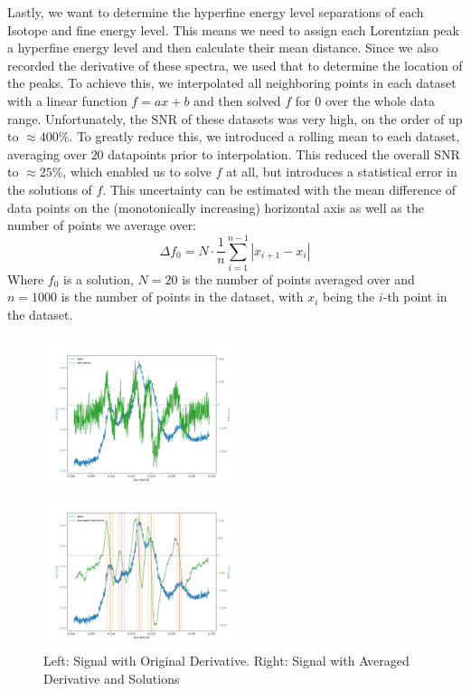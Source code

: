 \documentclass[12pt, a4paper]{article}
\begin{document}
Lastly, we want to determine the hyperfine energy level separations of each Isotope and fine energy level. This means we need to assign each Lorentzian peak a hyperfine energy level and then calculate their mean distance. Since we also recorded the derivative of these spectra, we used that to determine the location of the peaks. To achieve this, we interpolated all neighboring points in each dataset with a linear function $f = ax + b$ and then solved $f$ for $0$ over the whole data range. Unfortunately, the SNR of these datasets was very high, on the order of up to $\approx 400\%$. To greatly reduce this, we introduced a rolling mean to each dataset, averaging over $20$ datapoints prior to interpolation. This reduced the overall SNR to $\approx 25\%$, which enabled us to solve $f$ at all, but introduces a statistical error in the solutions of $f$. This uncertainty can be estimated with the mean difference of data points on the (monotonically increasing) horizontal axis as well as the number of points we average over:
\begin{equation}
\Delta f_0 = N \cdot \frac{1}{n} \sum_{i = 1}^{n - 1} \left\lvert x_{i + 1} - x_i \right\rvert
\label{interpolationuncertainty}
\end{equation}
Where $f_0$ is a solution, $N = 20$ is the number of points averaged over and $n = 1000$ is the number of points in the dataset, with $x_i$ being the $i$-th point in the dataset.

\begin{figure}
    \centering
    \parbox{0.45\textwidth}{
        \includegraphics[width=0.5\textwidth]{originalderivative.png}
    }
    \hfill
    \parbox{0.45\textwidth}{
        \includegraphics[width=0.5\textwidth]{averagedderivative.png}
    }
    \caption{Left: Signal with Original Derivative. Right: Signal with Averaged Derivative and Solutions}
    \label{lorentzianprofile}
\end{figure}
\end{document}
